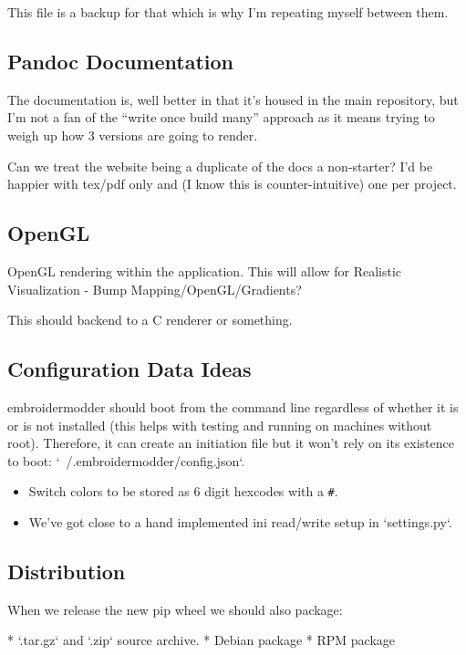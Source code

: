 \documentclass{report}
\begin{document}
This file is a backup for that which is why I'm repeating myself between them.

\subsection{Pandoc Documentation}

The documentation is, well better in that it's housed in the main repository,
but I'm not a fan of the ``write once build many'' approach as it means
trying to weigh up how 3 versions are going to render.

Can we treat the website being a duplicate of the docs a non-starter?
I'd be happier with tex/pdf only and (I know this is counter-intuitive) one
per project.

\subsection{OpenGL}

OpenGL rendering within the application. This will allow for
Realistic Visualization - Bump Mapping/OpenGL/Gradients?

This should backend to a C renderer or something.

\subsection{Configuration Data Ideas}

embroidermodder should boot from the command line
regardless of whether it is or is not installed (this helps with testing and
running on machines without root). Therefore, it can create an initiation file
but it won't rely on its existence to boot: `~/.embroidermodder/config.json`.

\begin{itemize}
\item Switch colors to be stored as 6 digit hexcodes with a \texttt{\#}.
\item We've got close to a hand implemented ini read/write setup in `settings.py`.
\end{itemize}

\subsection{Distribution}

When we release the new pip wheel we should also package:

* `.tar.gz` and `.zip` source archive.
* Debian package
* RPM package
\end{document}

